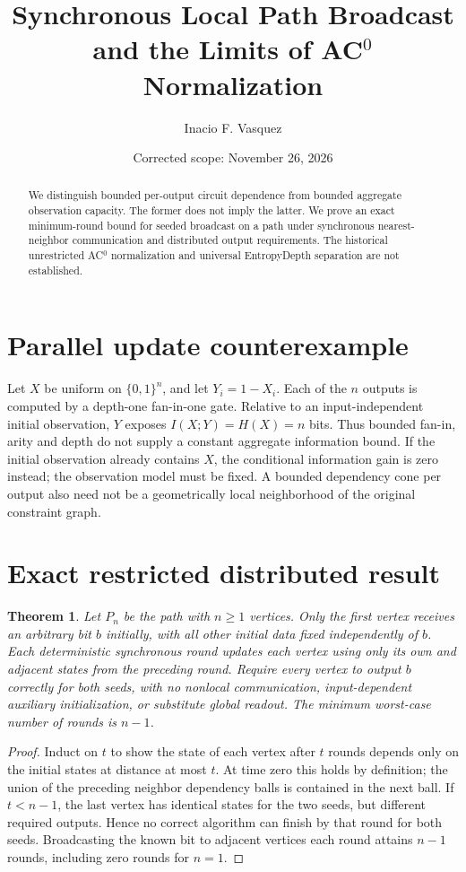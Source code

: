 \documentclass[11pt]{article}
\title{Synchronous Local Path Broadcast and the Limits of AC$^0$ Normalization}
\author{Inacio F. Vasquez}
\date{Corrected scope: November 26, 2026}
\newtheorem{theorem}{Theorem}
\begin{document}
\maketitle
\begin{abstract}
We distinguish bounded per-output circuit dependence from bounded aggregate
observation capacity. The former does not imply the latter. We prove an
exact minimum-round bound for seeded broadcast on a path under synchronous
nearest-neighbor communication and distributed output requirements.
The historical unrestricted AC$^0$ normalization and universal
EntropyDepth separation are not established.
\end{abstract}
\section{Parallel update counterexample}
Let $X$ be uniform on $\{0,1\}^n$, and let $Y_i=1-X_i$.
Each of the $n$ outputs is computed by a depth-one fan-in-one gate.
Relative to an input-independent initial observation, $Y$ exposes
$I(X;Y)=H(X)=n$ bits. Thus bounded fan-in, arity and depth do not
supply a constant aggregate information bound. If the initial
observation already contains $X$, the conditional information gain is
zero instead; the observation model must be fixed.
A bounded dependency cone per output also need not be a geometrically
local neighborhood of the original constraint graph.
\section{Exact restricted distributed result}
\begin{theorem}
Let $P_n$ be the path with $n\geq1$ vertices.
Only the first vertex receives an arbitrary bit $b$ initially, with
all other initial data fixed independently of $b$.
Each deterministic synchronous round updates each vertex using only
its own and adjacent states from the preceding round.
Require every vertex to output $b$ correctly for both seeds, with
no nonlocal communication, input-dependent auxiliary initialization,
or substitute global readout.
The minimum worst-case number of rounds is $n-1$.
\end{theorem}
\begin{proof}
Induct on $t$ to show the state of each vertex after $t$ rounds
depends only on the initial states at distance at most $t$.
At time zero this holds by definition; the union of the preceding
neighbor dependency balls is contained in the next ball.
If $t<n-1$, the last vertex has identical states for the two seeds,
but different required outputs. Hence no correct algorithm can
finish by that round for both seeds.
Broadcasting the known bit to adjacent vertices each round attains
$n-1$ rounds, including zero rounds for $n=1$.
\end{proof}
\end{document}
